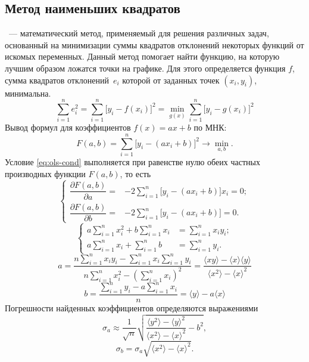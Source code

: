 \subsection{Метод наименьших квадратов}
~--- математический метод, применяемый для решения различных задач, основанный на минимизации суммы квадратов отклонений некоторых функций от искомых переменных. Данный метод помогает найти функцию, на которую лучшим образом ложатся точки на графике. Для этого определяется функция $f$, сумма квадратов отклонений~$e_i$ которой от заданных точек $\left( x_i, y_i \right)$, минимальна.
\begin{equation}
	\sum\limits_{i=1}^n e_i^2 = \sum\limits_{i=1}^n \bigl[ y_i - f(x_i) \bigr]^2 = \min_{g(x)} \sum\limits_{i=1}^n \bigl[y_i - g(x_i) \bigr]^2
	\label{eq:ols-cond}
\end{equation}
Вывод формул для коэффициентов  $f(x) = ax + b$ по МНК:
\begin{equation*}
	F(a,b) = \sum\limits_{i=1}^n \bigl[y_i-(ax_i + b) \bigr]^2 \rightarrow \min_{a, b}.
\end{equation*}
Условие \eqref{eq:ols-cond} выполняется при равенстве нулю обеих частных производных функции $F(a, b)$, то есть
\begin{equation*}
	\left\{
	\begin{aligned}
		\dfrac{\partial  F(a,b)}{\partial a} =& -2\sum\limits_{i=1}^n \bigl[ y_i-(ax_i + b) \bigr] x_i = 0;\\
		\dfrac{\partial  F(a,b)}{\partial b} =& -2\sum\limits_{i=1}^n \bigl[ y_i-(ax_i + b) \bigr] = 0.
	\end{aligned} \right.
\end{equation*}
\begin{equation*}
	\left\{
	\begin{aligned}
		a \sum\limits_{i=1}^n x_i^2 + b \sum\limits_{i=1}^n x_i &= \sum\limits_{i=1}^n x_i y_i;\\
		a\sum\limits_{i=1}^n x_i + \sum\limits_{i=1}^n b &= \sum\limits_{i=1}^n y_i.
	\end{aligned} \right.
\end{equation*}
\begin{equation}
	a = \dfrac{n\sum\limits_{i=1}^n x_i y_i - \sum\limits_{i=1}^n x_i \sum\limits_{i=1}^n y_i}{n \sum\limits_{i=1}^n x_i^2 - \left(\sum\limits_{i=1}^n x_i\right)^2}
	= \dfrac{\langle xy \rangle -\langle x\rangle \langle y \rangle}{\langle x^2 \rangle - \langle x \rangle^2}
\end{equation}
\begin{equation}
	b = \dfrac{\sum\limits_{i=1}^n y_i - a \sum\limits_{i=1}^n x_i}{n}
	= \langle y \rangle - a \langle x \rangle
\end{equation}
Погрешности найденных коэффициентов определяются выражениями
\begin{equation}
	\sigma_a \approx \frac{1}{\sqrt{n}} \sqrt{\dfrac{\langle y^2 \rangle - \langle y \rangle^2}{\langle x^2 \rangle - \langle x \rangle^2} - b^2},
\end{equation}
\begin{equation}
	\sigma_b = \sigma_a \sqrt{\langle x^2 \rangle - \langle x \rangle^2}.
\end{equation}
